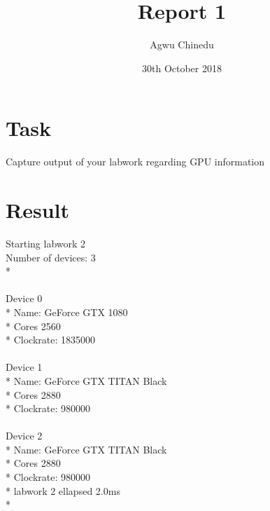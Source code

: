 \documentclass[letterpaper,12pt]{article}
\begin{document}
\title{Report 1}
\author{Agwu Chinedu}
\date{30th October 2018}
\maketitle


\section{Task}
Capture output of your labwork regarding GPU information


\section{Result}
Starting labwork 2\\
Number of devices: 3\\*
\paragraph{}
Device 0\\*
Name: GeForce GTX 1080\\*
Cores 2560\\*
Clockrate: 1835000\\
\paragraph{}
Device 1\\*
Name: GeForce GTX TITAN Black\\*
Cores 2880\\*
Clockrate: 980000\\
\paragraph{}
Device 2\\*
Name: GeForce GTX TITAN Black\\*
Cores 2880\\*
Clockrate: 980000\\*
labwork 2 ellapsed 2.0ms\\*
\end{document}
